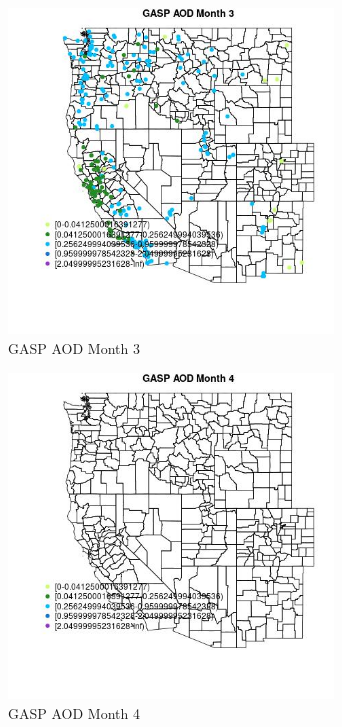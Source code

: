 \begin{figure} 
\centering  
\includegraphics[width=0.77\textwidth]{Code_Outputs/Report_ML_input_PM25_Step4_part_e_de_duplicated_aves_compiled_2019-05-18wNAs_MapObsMo3GASP_AOD.jpg} 
\caption{\label{fig:Report_ML_input_PM25_Step4_part_e_de_duplicated_aves_compiled_2019-05-18wNAsMapObsMo3GASP_AOD}GASP AOD Month 3} 
\end{figure} 
 

\begin{figure} 
\centering  
\includegraphics[width=0.77\textwidth]{Code_Outputs/Report_ML_input_PM25_Step4_part_e_de_duplicated_aves_compiled_2019-05-18wNAs_MapObsMo4GASP_AOD.jpg} 
\caption{\label{fig:Report_ML_input_PM25_Step4_part_e_de_duplicated_aves_compiled_2019-05-18wNAsMapObsMo4GASP_AOD}GASP AOD Month 4} 
\end{figure} 
 

